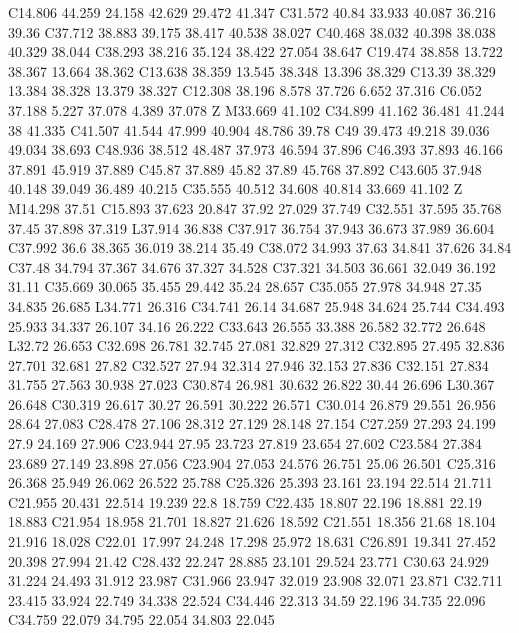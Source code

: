 {\begin{scope}[cm={0.569055,0,0,-0.569055,(-0.5cm,0.5cm)}]
{      C14.806 44.259 24.158 42.629 29.472 41.347 C31.572 40.84 33.933 40.087 36.216 39.36
      C37.712 38.883 39.175 38.417 40.538 38.027 C40.468 38.032 40.398 38.038 40.329 38.044
      C38.293 38.216 35.124 38.422 27.054 38.647 C19.474 38.858 13.722 38.367 13.664 38.362
      C13.638 38.359 13.545 38.348 13.396 38.329 C13.39 38.329 13.384 38.328 13.379 38.327
      C12.308 38.196 8.578 37.726 6.652 37.316 C6.052 37.188 5.227 37.078 4.389 37.078 Z
      M33.669 41.102 C34.899 41.162 36.481 41.244 38 41.335
      C41.507 41.544 47.999 40.904 48.786 39.78 C49 39.473 49.218 39.036 49.034 38.693
      C48.936 38.512 48.487 37.973 46.594 37.896 C46.393 37.893 46.166 37.891 45.919 37.889
      C45.87 37.889 45.82 37.89 45.768 37.892 C43.605 37.948 40.148 39.049 36.489 40.215
      C35.555 40.512 34.608 40.814 33.669 41.102 Z M14.298 37.51
      C15.893 37.623 20.847 37.92 27.029 37.749 C32.551 37.595 35.768 37.45 37.898 37.319
      L37.914 36.838 C37.917 36.754 37.943 36.673 37.989 36.604
      C37.992 36.6 38.365 36.019 38.214 35.49 C38.072 34.993 37.63 34.841 37.626 34.84
      C37.48 34.794 37.367 34.676 37.327 34.528 C37.321 34.503 36.661 32.049 36.192 31.11
      C35.669 30.065 35.455 29.442 35.24 28.657 C35.055 27.978 34.948 27.35 34.835 26.685
      L34.771 26.316 C34.741 26.14 34.687 25.948 34.624 25.744
      C34.493 25.933 34.337 26.107 34.16 26.222 C33.643 26.555 33.388 26.582 32.772 26.648
      L32.72 26.653 C32.698 26.781 32.745 27.081 32.829 27.312
      C32.895 27.495 32.836 27.701 32.681 27.82 C32.527 27.94 32.314 27.946 32.153 27.836
      C32.151 27.834 31.755 27.563 30.938 27.023 C30.874 26.981 30.632 26.822 30.44 26.696
      L30.367 26.648 C30.319 26.617 30.27 26.591 30.222 26.571
      C30.014 26.879 29.551 26.956 28.64 27.083 C28.478 27.106 28.312 27.129 28.148 27.154
      C27.259 27.293 24.199 27.9 24.169 27.906 C23.944 27.95 23.723 27.819 23.654 27.602
      C23.584 27.384 23.689 27.149 23.898 27.056 C23.904 27.053 24.576 26.751 25.06 26.501
      C25.316 26.368 25.949 26.062 26.522 25.788 C25.326 25.393 23.161 23.194 22.514 21.711
      C21.955 20.431 22.514 19.239 22.8 18.759 C22.435 18.807 22.196 18.881 22.19 18.883
      C21.954 18.958 21.701 18.827 21.626 18.592 C21.551 18.356 21.68 18.104 21.916 18.028
      C22.01 17.997 24.248 17.298 25.972 18.631 C26.891 19.341 27.452 20.398 27.994 21.42
      C28.432 22.247 28.885 23.101 29.524 23.771 C30.63 24.929 31.224 24.493 31.912 23.987
      C31.966 23.947 32.019 23.908 32.071 23.871 C32.711 23.415 33.924 22.749 34.338 22.524
      C34.446 22.313 34.59 22.196 34.735 22.096 C34.759 22.079 34.795 22.054 34.803 22.045
}
\end{scope}}
